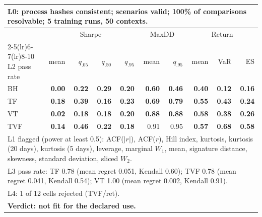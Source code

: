 \begin{tabular}{lrrrrrrrrr}
\toprule
\multicolumn{10}{p{13.5cm}}{L0: process hashes consistent; scenarios valid; 100\% of comparisons resolvable; 5 training runs, 50 contexts.} \\
\midrule
 & \multicolumn{4}{c}{Sharpe} & \multicolumn{2}{c}{MaxDD} & \multicolumn{3}{c}{Return} \\
\cmidrule(lr){2-5}\cmidrule(lr){6-7}\cmidrule(lr){8-10}
L2 pass rate & mean & $q_{.05}$ & $q_{.50}$ & $q_{.95}$ & mean & $q_{.95}$ & mean & VaR & ES \\
\midrule
BH & \textbf{0.00} & \textbf{0.22} & \textbf{0.29} & \textbf{0.20} & \textbf{0.60} & \textbf{0.46} & \textbf{0.40} & \textbf{0.12} & \textbf{0.16} \\
TF & \textbf{0.18} & \textbf{0.39} & \textbf{0.16} & \textbf{0.23} & \textbf{0.69} & \textbf{0.79} & \textbf{0.55} & \textbf{0.43} & \textbf{0.24} \\
VT & \textbf{0.02} & \textbf{0.18} & \textbf{0.18} & \textbf{0.20} & \textbf{0.88} & \textbf{0.88} & \textbf{0.58} & \textbf{0.38} & \textbf{0.26} \\
TVF & \textbf{0.14} & \textbf{0.46} & \textbf{0.22} & \textbf{0.18} & 0.91 & 0.95 & \textbf{0.57} & \textbf{0.68} & \textbf{0.58} \\
\midrule
\multicolumn{10}{p{13.5cm}}{L1 flagged (power at least 0.5): ACF($|r|$), ACF($r$), Hill index, kurtosis, kurtosis (20 days), kurtosis (5 days), leverage, marginal $W_1$, mean, signature distance, skewness, standard deviation, sliced $W_2$.} \\
\multicolumn{10}{p{13.5cm}}{L3 pass rate: TF 0.78 (mean regret 0.051, Kendall 0.60); TVF 0.78 (mean regret 0.041, Kendall 0.54); VT 1.00 (mean regret 0.002, Kendall 0.91).} \\
\multicolumn{10}{p{13.5cm}}{L4: 1 of 12 cells rejected (TVF/ret).} \\
\multicolumn{10}{p{13.5cm}}{\textbf{Verdict: not fit for the declared use.}} \\
\bottomrule
\end{tabular}
